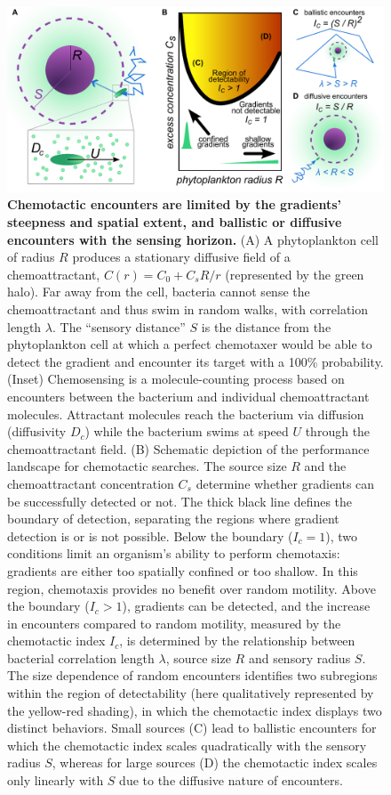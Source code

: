 \documentclass[9pt,twocolumn,twoside]{pnas-new}
\begin{document}
\begin{figure}
    \centering
    \includegraphics[width=17.8cm]{fig2_new.pdf}
    \caption{
        \textbf{
        Chemotactic encounters are limited by the gradients' steepness and spatial extent, and ballistic or diffusive encounters with the sensing horizon.
        }
        (A) A phytoplankton cell of radius $R$ produces a stationary diffusive field of a chemoattractant, $C(r) = C_0 + C_s R/r$ (represented by the green halo).
        Far away from the cell, bacteria cannot sense the chemoattractant and thus swim in random walks, with correlation length $\lambda$.
        The ``sensory distance'' $S$ is the distance from the phytoplankton cell at which a perfect chemotaxer would be able to detect the gradient and encounter its target with a 100\% probability.
        (Inset) Chemosensing is a molecule-counting process based on encounters between the bacterium and individual chemoattractant molecules.
        Attractant molecules reach the bacterium via diffusion (diffusivity $D_c$) while the bacterium swims at speed $U$ through the chemoattractant field.
        (B) Schematic depiction of the performance landscape for chemotactic searches.
        The source size $R$ and the chemoattractant concentration $C_s$ determine whether gradients can be successfully detected or not.
        The thick black line defines the boundary of detection, separating the regions where gradient detection is or is not possible.
        Below the boundary ($I_c=1$), two conditions limit an organism's ability to perform chemotaxis: gradients are either too spatially confined or too shallow. In this region, chemotaxis provides no benefit over random motility.
        Above the boundary ($I_c>1$), gradients can be detected, and the increase in encounters compared to random motility, measured by the chemotactic index $I_c$, is determined by the relationship between bacterial correlation length $\lambda$, source size $R$ and sensory radius $S$.
        The size dependence of random encounters identifies two subregions within the region of detectability (here qualitatively represented by the yellow-red shading), in which the chemotactic index displays two distinct behaviors.
        Small sources (C) lead to ballistic encounters for which the chemotactic index scales quadratically with the sensory radius $S$, whereas for large sources (D) the chemotactic index scales only linearly with $S$ due to the diffusive nature of encounters.
    }
    \label{fig:sensing}
\end{figure}
\end{document}
